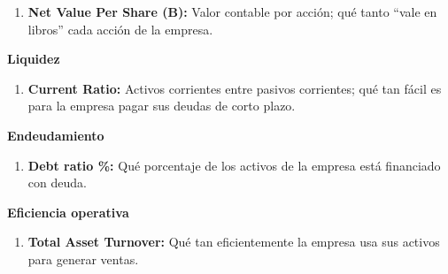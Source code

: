 \documentclass[
]{book}
\providecommand{\tightlist}{%
  \setlength{\itemsep}{0pt}\setlength{\parskip}{0pt}}
\begin{document}
\begin{enumerate}
\def\labelenumi{\arabic{enumi}.}
\setcounter{enumi}{2}
\tightlist
\item
  \textbf{Net Value Per Share (B):} Valor contable por acción; qué tanto ``vale en libros''
  cada acción de la empresa.
\end{enumerate}

\textbf{Liquidez}

\begin{enumerate}
\def\labelenumi{\arabic{enumi}.}
\setcounter{enumi}{3}
\tightlist
\item
  \textbf{Current Ratio:} Activos corrientes entre pasivos corrientes; qué tan fácil es
  para la empresa pagar sus deudas de corto plazo.
\end{enumerate}

\textbf{Endeudamiento}

\begin{enumerate}
\def\labelenumi{\arabic{enumi}.}
\setcounter{enumi}{4}
\tightlist
\item
  \textbf{Debt ratio \%:} Qué porcentaje de los activos de la empresa está financiado con
  deuda.
\end{enumerate}

\textbf{Eficiencia operativa}

\begin{enumerate}
\def\labelenumi{\arabic{enumi}.}
\setcounter{enumi}{5}
\tightlist
\item
  \textbf{Total Asset Turnover:} Qué tan eficientemente la empresa usa sus activos para
  generar ventas.
\end{enumerate}
\end{document}

